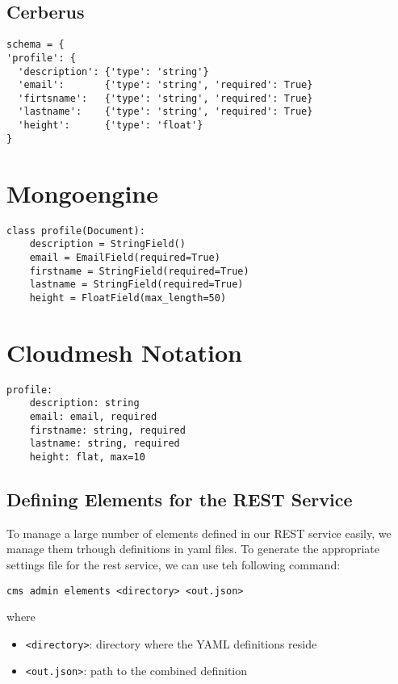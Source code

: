 \documentclass[9pt,twocolumn,twoside]{styles/osajnl}
\begin{document}
\subsection{Cerberus}

\begin{Verbatim}
schema = {
'profile': {
  'description': {'type': 'string'}
  'email':       {'type': 'string', 'required': True}
  'firtsname':   {'type': 'string', 'required': True}
  'lastname':    {'type': 'string', 'required': True}
  'height':      {'type': 'float'}
}
\end{Verbatim}

\section{Mongoengine}

\begin{Verbatim}
class profile(Document):
    description = StringField()
    email = EmailField(required=True)
    firstname = StringField(required=True)
    lastname = StringField(required=True)
    height = FloatField(max_length=50)
\end{Verbatim}

\section{Cloudmesh Notation}

\begin{Verbatim}
profile:
    description: string
    email: email, required
    firstname: string, required
    lastname: string, required
    height: flat, max=10
\end{Verbatim}

\subsection{Defining Elements for the REST Service}

To manage a large number of elements defined in our REST service
easily, we manage them trhough definitions in yaml files. To generate
the appropriate settings file for the rest service, we can use teh
following command:

\begin{verbatim}
cms admin elements <directory> <out.json>
\end{verbatim}

where

\begin{itemize}
\item \verb+<directory>+: directory where the YAML definitions reside
\item \verb+<out.json>+: path to the combined definition
\end{itemize}
\end{document}
